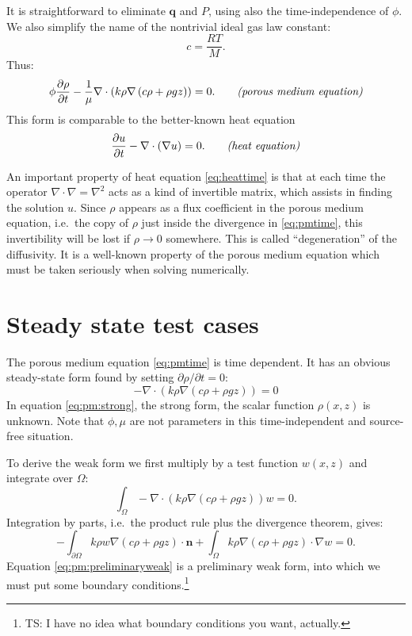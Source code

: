 \documentclass[11pt]{amsart}
\newcommand{\bn}{\mathbf{n}}
\newcommand{\bq}{\mathbf{q}}
\newcommand{\Div}{\nabla\cdot}
\newcommand{\grad}{\nabla}
\begin{document}
It is straightforward to eliminate $\bq$ and $P$, using also the time-independence of $\phi$.  We also simplify the name of the nontrivial ideal gas law constant:
\begin{equation}
c = \frac{RT}{M}.  \label{eq:crename}
\end{equation}
Thus:
\begin{equation}
\phi \frac{\partial \rho}{\partial t} - \frac{1}{\mu} \Div \left(k \rho \grad\left(c \rho + \rho g z\right)\right) = 0.  \qquad \text{\emph{(porous medium equation)}} \label{eq:pmtime}
\end{equation}
This form is comparable to the better-known heat equation
\begin{equation}
\frac{\partial u}{\partial t} - \Div(\grad u) = 0. \qquad \text{\emph{(heat equation)}}\label{eq:heattime}
\end{equation}

An important property of heat equation \eqref{eq:heattime} is that at each time the operator $\Div \grad = \grad^2$ acts as a kind of invertible matrix, which assists in finding the solution $u$.  Since $\rho$ appears as a flux coefficient in the porous medium equation, i.e.~the copy of $\rho$ just inside the divergence in \eqref{eq:pmtime}, this invertibility will be lost if $\rho\to 0$ somewhere.  This is called ``degeneration'' of the diffusivity.  It is a well-known property of the porous medium equation which must be taken seriously when solving numerically.


\section{Steady state test cases}

The porous medium equation \eqref{eq:pmtime} is time dependent.  It has an obvious steady-state form found by setting $\partial \rho/\partial t = 0$:
\begin{equation}
- \Div \left(k \rho \grad\left(c \rho + \rho g z\right)\right) = 0 \label{eq:pm:strong}
\end{equation}
In equation \eqref{eq:pm:strong}, the strong form, the scalar function $\rho(x,z)$ is unknown.  Note that $\phi,\mu$ are not parameters in this time-independent and source-free situation.  

To derive the weak form we first multiply by a test function $w(x,z)$ and integrate over $\Omega$:
    $$\int_\Omega- \Div \left(k \rho \grad\left(c \rho + \rho g z\right)\right) w = 0.$$
Integration by parts, i.e.~the product rule plus the divergence theorem, gives:
\begin{equation}
- \int_{\partial\Omega} k \rho w \grad\left(c \rho + \rho g z\right) \cdot \bn + \int_\Omega k \rho \grad\left(c \rho + \rho g z\right) \cdot \grad w = 0.\label{eq:pm:preliminaryweak}
\end{equation}
Equation \eqref{eq:pm:preliminaryweak} is a preliminary weak form, into which we must put some boundary conditions.\footnote{TS: I have no idea what boundary conditions you want, actually.}
\end{document}
